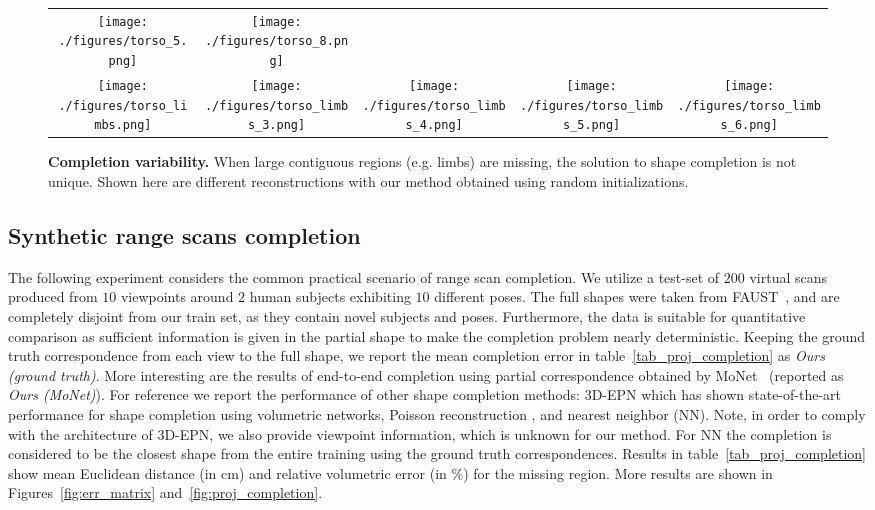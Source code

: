 \begin{figure}
{\begin{tabular}{c@{\hskip 5mm}|@{\hskip 5mm}cccc}
\texttt{[image: ./figures/torso\_5.png]} &
\texttt{[image: ./figures/torso\_8.png]} \\
\texttt{[image: ./figures/torso\_limbs.png]} &
\texttt{[image: ./figures/torso\_limbs\_3.png]} & 
\texttt{[image: ./figures/torso\_limbs\_4.png]} & 
\texttt{[image: ./figures/torso\_limbs\_5.png]} & 
\texttt{[image: ./figures/torso\_limbs\_6.png]}
\end{tabular}
}
\caption{\textbf{Completion variability.} When large contiguous regions (e.g. limbs) are missing, the solution to shape completion is not unique. Shown here are different reconstructions with our method obtained using random initializations.
} 
\label{fig:completion_variability}
\end{figure} 

%

\subsection{Synthetic range scans completion}
\label{subsec:range_scans_completion}
The following experiment considers the common practical scenario of range scan completion.
We utilize a test-set of $200$ virtual scans produced from $10$ viewpoints around $2$ human subjects exhibiting $10$ different poses. The full shapes were taken from FAUST~\cite{Bogo:CVPR:2014}, and are completely disjoint from our train set, as they contain novel subjects and poses. Furthermore, the data is suitable for quantitative comparison as sufficient information is given in the partial shape to make the completion problem nearly deterministic. Keeping the ground truth correspondence from each view to the full shape, we report the mean completion error in table~\ref{tab_proj_completion} as \emph{Ours (ground truth)}. More interesting are the results of end-to-end completion using partial correspondence obtained by MoNet~\cite{monet} (reported as \emph{Ours (MoNet)}). For reference we report the performance of other shape completion methods: 3D-EPN \cite{dai2016shape} which has shown state-of-the-art performance for shape completion using volumetric networks, Poisson reconstruction \cite{kazhdan2013screened}, and nearest neighbor (NN). Note, in order to comply with the architecture of 3D-EPN, we also provide viewpoint information, which is unknown for our method. For NN the completion is considered to be the closest shape from the entire training using the ground truth correspondences. Results in table~\ref{tab_proj_completion} show mean Euclidean distance (in cm) and relative volumetric error (in \%) for the missing region. More results are shown in Figures~\ref{fig:err_matrix} and~\ref{fig:proj_completion}.

